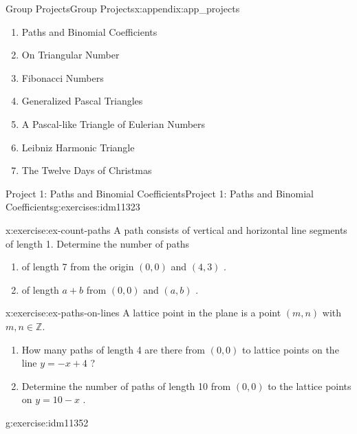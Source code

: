 \documentclass[oneside,10pt,]{book}
\numberwithin{equation}{chapter}
\def\Z{\mathbb Z}
\begin{document}
\begin{appendixptx}{Group Projects}{}{Group Projects}{}{}{x:appendix:app_projects}
\begin{introduction}{}%
%
\begin{enumerate}
\item{}Paths and Binomial Coefficients%
\item{}On Triangular Number%
\item{}Fibonacci Numbers%
\item{}Generalized Pascal Triangles%
\item{}A Pascal-like Triangle of Eulerian Numbers%
\item{}Leibniz Harmonic Triangle%
\item{}The Twelve Days of Christmas%
\end{enumerate}
%
\end{introduction}%
%
%
\typeout{************************************************}
\typeout{************************************************}
%
\begin{exercises-section-numberless}{Project 1: Paths and Binomial Coefficients}{}{Project 1: Paths and Binomial Coefficients}{}{}{g:exercises:idm11323}
\begin{divisionexercise}{1}{}{}{x:exercise:ex-count-paths}%
A path consists of vertical and horizontal line segments of length 1. Determine the number of paths%
\begin{enumerate}[label=(\alph*)]
\item{}of length 7 from the origin \(\left( 0,0 \right)\) and \((4,3)\) .%
\item{}of length \(a + b\) from \(\left( 0,0 \right)\) and \((a,b)\) .%
\end{enumerate}
%
\end{divisionexercise}%
\begin{divisionexercise}{2}{}{}{x:exercise:ex-paths-on-lines}%
A lattice point in the plane is a point \((m,n)\) with \(m,n \in \Z\).%
\begin{enumerate}[label=(\alph*)]
\item{}How many paths of length 4 are there from \((0,0)\) to lattice points on the line \(y = - x + 4\) ?%
\item{}Determine the number of paths of length 10 from \((0,0)\) to the lattice points on \(y = 10 - x\) .%
\end{enumerate}
%
\end{divisionexercise}%
\begin{divisionexercise}{3}{}{}{g:exercise:idm11352}%

\end{divisionexercise}
\end{exercises-section-numberless}
\end{appendixptx}
\end{document}
